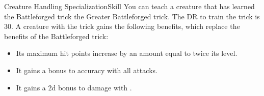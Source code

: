 \begin{feat}{Creature Handling Specialization}{Skill}
         You can teach a creature that has learned the Battleforged trick the Greater Battleforged trick.
        The DR to train the trick is 30.
        A creature with the trick gains the following benefits, which replace the benefits of the Battleforged trick:
        \begin{itemize}
            \item Its maximum hit points increase by an amount equal to twice its level.
            \item It gains a  bonus to accuracy with all attacks.
            \item It gains a \plus2d bonus to damage with .
        \end{itemize}
    \end{feat}

